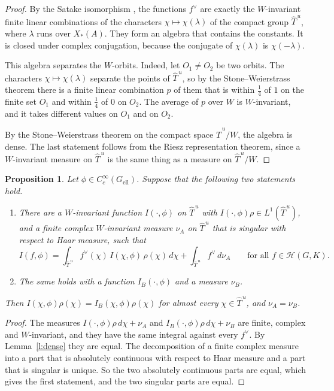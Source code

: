 \documentclass[12pt,letterpaper]{article}
\numberwithin{equation}{section}
\theoremstyle{plain}
\newtheorem{proposition}[theorem]{Proposition}
\theoremstyle{definition}
\theoremstyle{remark}
\newcommand{\Hc}{\mathcal{H}}
\newcommand{\Thu}{\widehat{T}^{\,u}}
\newcommand{\ellr}{\mathrm{ell}}
\begin{document}
\begin{proof}
By the Satake isomorphism \cite{Sa63}, the functions $f^\vee$ are exactly the $W$-invariant finite linear combinations of the characters $\chi\mapsto\chi(\lambda)$ of the compact group $\Thu$, where $\lambda$ runs over $X_*(A)$. They form an algebra that contains the constants. It is closed under complex conjugation, because the conjugate of $\chi(\lambda)$ is $\chi(-\lambda)$.

This algebra separates the $W$-orbits. Indeed, let $O_1\ne O_2$ be two orbits. The characters $\chi\mapsto\chi(\lambda)$ separate the points of $\Thu$, so by the Stone--Weierstrass theorem there is a finite linear combination $p$ of them that is within $\frac14$ of $1$ on the finite set $O_1$ and within $\frac14$ of $0$ on $O_2$. The average of $p$ over $W$ is $W$-invariant, and it takes different values on $O_1$ and on $O_2$.

By the Stone--Weierstrass theorem on the compact space $\Thu/W$, the algebra is dense. The last statement follows from the Riesz representation theorem, since a $W$-invariant measure on $\Thu$ is the same thing as a measure on $\Thu/W$.
\end{proof}

\begin{proposition}\label{p:AB}
Let $\phi\in C_c^\infty(G_{\ellr})$. Suppose that the following two statements hold.
\begin{enumerate}[label=(\Alph*)]
\item\label{h:A} There are a $W$-invariant function $I(\cdot,\phi)$ on $\Thu$ with $I(\cdot,\phi)\rho\in L^1(\Thu)$, and a finite complex $W$-invariant measure $\nu_A$ on $\Thu$ that is singular with respect to Haar measure, such that
\[
I(f,\phi)=\int_{\Thu}f^\vee(\chi)\,I(\chi,\phi)\,\rho(\chi)\,d\chi+\int_{\Thu}f^\vee\,d\nu_A\qquad\text{for all }f\in\Hc(G,K).
\]
\item\label{h:B} The same holds with a function $I_B(\cdot,\phi)$ and a measure $\nu_B$.
\end{enumerate}
Then $I(\chi,\phi)\rho(\chi)=I_B(\chi,\phi)\rho(\chi)$ for almost every $\chi\in\Thu$, and $\nu_A=\nu_B$.
\end{proposition}

\begin{proof}
The measures $I(\cdot,\phi)\rho\,d\chi+\nu_A$ and $I_B(\cdot,\phi)\rho\,d\chi+\nu_B$ are finite, complex and $W$-invariant, and they have the same integral against every $f^\vee$. By Lemma~\ref{l:dense} they are equal. The decomposition of a finite complex measure into a part that is absolutely continuous with respect to Haar measure and a part that is singular is unique. So the two absolutely continuous parts are equal, which gives the first statement, and the two singular parts are equal.
\end{proof}
\end{document}
